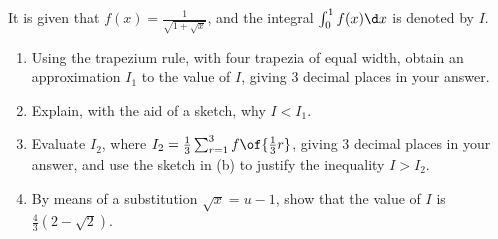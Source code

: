 \clearpage
\begin{problem}
    It is given that $f(x) = \frac1{\sqrt{1 + \sqrt{x}}}$, and the integral $\int_0^1 f(x) \d x$ is denoted by $I$.

    \begin{enumerate}
        \item Using the trapezium rule, with four trapezia of equal width, obtain an approximation $I_1$ to the value of $I$, giving 3 decimal places in your answer.
        \item Explain, with the aid of a sketch, why $I < I_1$.
        \item Evaluate $I_2$, where $I_2 = \frac13 \sum_{r = 1}^3 f\of{\frac13 r}$, giving 3 decimal places in your answer, and use the sketch in (b) to justify the inequality $I > I_2$.
        \item By means of a substitution $\sqrt{x} = u -1$, show that the value of $I$ is $\frac43(2 - \sqrt2)$.
    \end{enumerate}
\end{problem}
